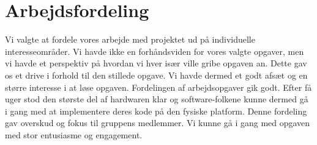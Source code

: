 \section{Arbejdsfordeling}

Vi valgte at fordele vores arbejde med projektet ud på individuelle interesseområder. Vi havde ikke en forhåndsviden for vores valgte opgaver, men vi havde et perspektiv på hvordan vi hver især ville gribe opgaven an. Dette gav os et drive i forhold til den stillede opgave. Vi havde dermed et godt afsæt og en større interesse i at løse opgaven. 
Fordelingen af arbejdsopgaver gik godt. Efter få uger stod den største del af hardwaren klar og software-folkene kunne dermed gå i gang med at implementere deres kode på den fysiske platform. 
Denne fordeling gav overskud og fokus til gruppens medlemmer. Vi kunne gå i gang med opgaven med stor entusiasme og engagement.